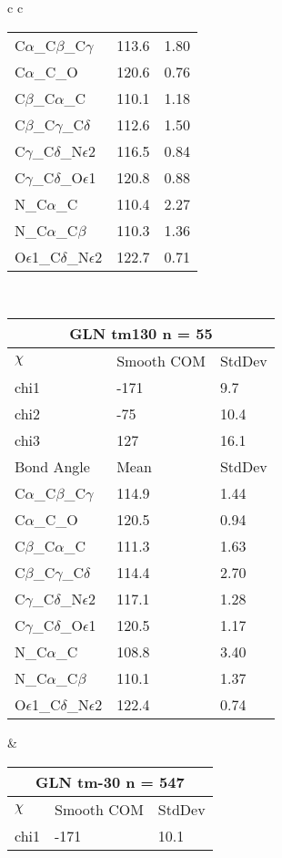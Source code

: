 \begin{longtable}{ c c }
\begin{tabular}{ l l l }
  C$\alpha$\_C$\beta$\_C$\gamma$ & 113.6 & 1.80\\
  C$\alpha$\_C\_O & 120.6 & 0.76\\
  C$\beta$\_C$\alpha$\_C & 110.1 & 1.18\\
  C$\beta$\_C$\gamma$\_C$\delta$ & 112.6 & 1.50\\
  C$\gamma$\_C$\delta$\_N$\epsilon$2 & 116.5 & 0.84\\
  C$\gamma$\_C$\delta$\_O$\epsilon$1 & 120.8 & 0.88\\
  N\_C$\alpha$\_C & 110.4 & 2.27\\
  N\_C$\alpha$\_C$\beta$ & 110.3 & 1.36\\
  O$\epsilon$1\_C$\delta$\_N$\epsilon$2 & 122.7 & 0.71\\
  \bottomrule
  \end{tabular}
  \\
  \begin{tabular}{ l l l }
  \toprule
  \multicolumn{3}{c}{GLN \textbf{tm130} n = 55} \\ \toprule
  $\chi$       & Smooth COM & StdDev \\ \midrule
  chi1 & -171 & 9.7 \\ 
  chi2 & -75 & 10.4 \\ 
  chi3 & 127 & 16.1 \\ \midrule
  Bond Angle   & Mean     & StdDev \\ \midrule
  C$\alpha$\_C$\beta$\_C$\gamma$ & 114.9 & 1.44\\
  C$\alpha$\_C\_O & 120.5 & 0.94\\
  C$\beta$\_C$\alpha$\_C & 111.3 & 1.63\\
  C$\beta$\_C$\gamma$\_C$\delta$ & 114.4 & 2.70\\
  C$\gamma$\_C$\delta$\_N$\epsilon$2 & 117.1 & 1.28\\
  C$\gamma$\_C$\delta$\_O$\epsilon$1 & 120.5 & 1.17\\
  N\_C$\alpha$\_C & 108.8 & 3.40\\
  N\_C$\alpha$\_C$\beta$ & 110.1 & 1.37\\
  O$\epsilon$1\_C$\delta$\_N$\epsilon$2 & 122.4 & 0.74\\
  \bottomrule
  \end{tabular}
  &
  \begin{tabular}{ l l l }
  \toprule
  \multicolumn{3}{c}{GLN \textbf{tm-30} n = 547} \\ \toprule
  $\chi$       & Smooth COM & StdDev \\ \midrule
  chi1 & -171 & 10.1 \\ 

\end{tabular}
\end{longtable}
